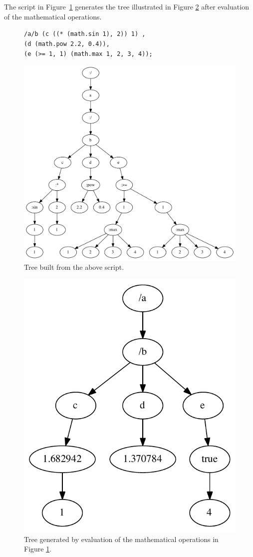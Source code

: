 \documentclass{article}
\newcommand{\code}	[2][0.9]		{\vspace{0mm}\begin{center}\colorbox{mygrey}{
							\begin{minipage}[t]{#1\columnwidth} 
							{\small \texttt{#2}}
							\end{minipage}}\end{center}}
\newcommand{\ulb}		{\hspace*{4mm}}
\begin{document}
The script in Figure~\ref{parsesample2} generates the tree illustrated in Figure \ref{treesample2} after evaluation of the mathematical operations.

\begin{figure}[htbp]
\code{/a/b 	(c ((* (math.sin 1), 2)) 1) ,\\
\ulb		(d (math.pow 2.2, 0.4)),\\
\ulb		(e (>= 1, 1) (math.max 1, 2, 3, 4));}
\begin{center}
\includegraphics[width=1.\columnwidth]{tree/sample3}
\caption{Tree built from the above script.}
\label{parsesample2}
\end{center}
\end{figure}

\begin{figure}[htbp]
\begin{center}
\includegraphics[width=0.7\columnwidth]{eval/sample3}
\caption{Tree generated by evaluation of the mathematical operations in Figure \ref{parsesample2}.}
\label{treesample2}
\end{center}
\end{figure}
\end{document}
